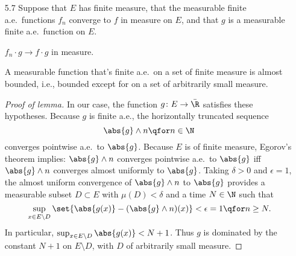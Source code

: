 \documentclass[onesided]{ccg-pset}
\begin{document}
\begin{enumerate}
\item[5.7] Suppose that $E$ has finite measure, that the measurable finite a.e.~functions $f_n$ converge to $f$ in measure on $E$, and that $g$ is a measurable finite a.e.~function on $E$.

\begin{prop*} 
$f_n\cdot g \to f \cdot g$ in measure. 
\end{prop*}

\begin{lem*}
A measurable function that's finite a.e.~on a set of finite measure is almost bounded, i.e., bounded except for on a set of arbitrarily small measure. \end{lem*}

\begin{proof}[Proof of lemma]
In our case, the function $g \colon E \to \bar \R$ satisfies these hypotheses. Because $g$ is finite a.e., the horizontally truncated sequence \[\abs{g} \wedge n \qfor n \in \N\] converges pointwise a.e.~to $\abs{g}$. Because $E$ is of finite measure, Egorov's theorem implies: $\abs{g} \wedge n$ converges pointwise a.e.~to $\abs{g}$ iff $\abs{g} \wedge n$ converges almost uniformly to $\abs{g}$. Taking $\delta > 0$ and $\epsilon = 1$, the almost uniform convergence of $\abs{g} \wedge n$ to $\abs{g}$ provides a measurable subset $D \subset E$ with $\mu(D) < \delta$ and a time $N \in \N$ such that 
\begin{equation*}
    \sup_{x \in E\setminus D} \set{\abs{g(x)} - (\abs{g} \wedge n)(x)} < \epsilon = 1 \qfor n \ge N.
\end{equation*}
In particular, $\sup_{x \in E\setminus D} \abs{g(x)}< N+1$. Thus $g$ is dominated by the constant $N+1$ on $E\setminus D$, with $D$ of arbitrarily small measure.
\end{proof}


\end{enumerate}
\end{document}
